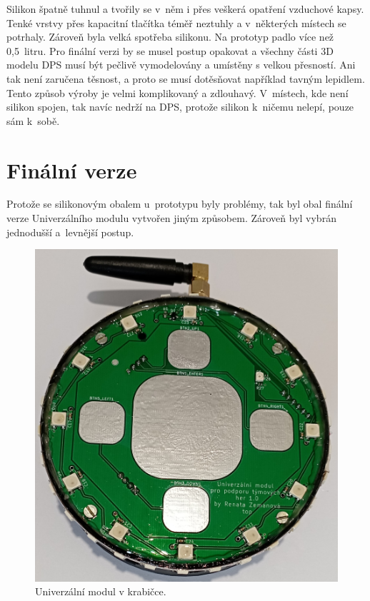 Silikon špatně tuhnul a tvořily se v~něm i přes veškerá opatření vzduchové kapsy. Tenké vrstvy přes kapacitní tlačítka téměř neztuhly a v~některých místech se potrhaly. Zároveň byla velká spotřeba silikonu. 
Na prototyp padlo více než 0,5~litru. Pro finální verzi by se musel postup opakovat a všechny části 3D modelu DPS musí být pečlivě vymodelovány a umístěny s velkou přesností. Ani tak není zaručena těsnost,
a proto se musí dotěsňovat například tavným lepidlem. Tento způsob výroby je velmi komplikovaný a zdlouhavý. V~místech, kde není silikon spojen, tak navíc nedrží na DPS, protože silikon k~ničemu nelepí, pouze 
sám k~sobě. 

\section{Finální verze}
Protože se silikonovým obalem u~prototypu byly problémy, tak byl obal finální verze Univerzálního modulu vytvořen jiným způsobem. Zároveň byl vybrán jednodušší a~levnější postup. 

\begin{figure}[!h]
  \begin{center}
    \includegraphics[scale=0.2]{obrazky/v_krabicce.jpg}
  \end{center}
  \caption[Univerzální modul v krabičce]{Univerzální modul v krabičce.}
\end{figure}

